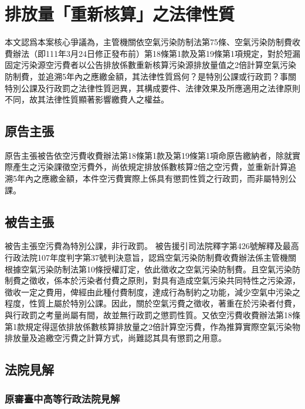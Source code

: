 \documentclass[14pt,a4paper]{article}
\begin{document}

\section{排放量「重新核算」之法律性質}
本文認爲本案核心爭議為，主管機關依空氣污染防制法第75條、空氣污染防制費收費辦法（即111年3月24日修正發布前）第18條第1款及第19條第1項規定，對於短漏固定污染源空污費者以公告排放係數重新核算污染源排放量值之2倍計算空氣污染防制費，並追溯5年內之應繳金額，其法律性質爲何？是特別公課或行政罰？事關
特別公課及行政罰之法律性質迥異，其構成要件、法律效果及所應適用之法律原則不同，故其法律性質顯著影響繳費人之權益。

\subsection{原告主張}
原告主張被告依空污費收費辦法第18條第1款及第19條第1項命原告繳納者，除就實際產生之污染課徵空污費外，尚依規定排放係數核算2倍之空污費，並重新計算追溯5年內之應繳金額，本件空污費實際上係具有懲罰性質之行政罰，而非屬特別公課。

\subsection{被告主張}
被告主張空污費為特別公課，非行政罰。
被告援引司法院釋字第426號解釋及最高行政法院107年度判字第37號判決意旨，認爲空氣污染防制費收費辦法係主管機關根據空氣污染防制法第10條授權訂定，依此徵收之空氣污染防制費。且空氣污染防制費之徵收，係本於污染者付費之原則，對具有造成空氣污染共同特性之污染源，徵收一定之費用，俾經由此種付費制度，達成行為制約之功能，減少空氣中污染之程度，性質上屬於特別公課。因此，關於空氣污費之徵收，著重在於污染者付費，與行政罰之考量尚屬有間，故並無行政罰之懲罰性質。又依空污費收費辦法第18條第1款規定得逕依排放係數核算排放量之2倍計算空污費，作為推算實際空氣污染物排放量及追繳空污費之計算方式，尚難認其具有懲罰之用意。

\subsection{法院見解}

\subsubsection{原審臺中高等行政法院見解}
\end{document}
